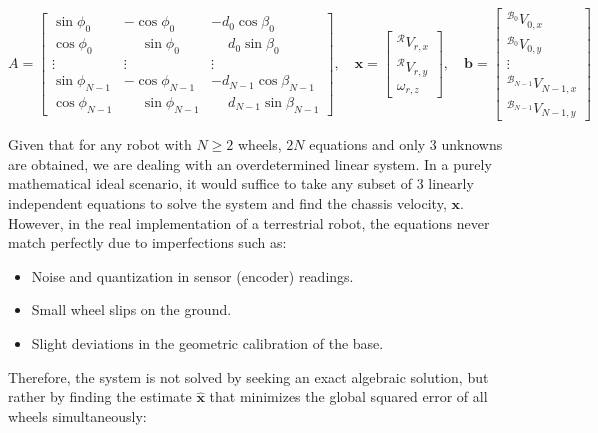 \documentclass[11pt,a4paper]{article}
\newcommand{\frameR}{\mathcal{R}}
\newcommand{\frameBZero}{\mathcal{B}_0}
\newcommand{\frameBNMinusOne}{\mathcal{B}_{N-1}}
\begin{document}
\[
    A = \begin{bmatrix}
        \sin\phi_0     & -\cos\phi_0               & -d_0\cos\beta_0                   \\
        \cos\phi_0     & \phantom{-}\sin\phi_0     & \phantom{-}d_0\sin\beta_0         \\
        \vdots         & \vdots                    & \vdots                            \\
        \sin\phi_{N-1} & -\cos\phi_{N-1}           & -d_{N-1}\cos\beta_{N-1}           \\
        \cos\phi_{N-1} & \phantom{-}\sin\phi_{N-1} & \phantom{-}d_{N-1}\sin\beta_{N-1}
    \end{bmatrix}, \quad \mathbf{x} =
    \begin{bmatrix}
        {}^\frameR V_{r,x} \\
        {}^\frameR V_{r,y} \\
        \omega_{r,z}
    \end{bmatrix}, \quad \mathbf{b} = \begin{bmatrix}
        {}^{\frameBZero}V_{0,x}        \\
        {}^{\frameBZero}V_{0,y}        \\
        \vdots                         \\
        {}^{\frameBNMinusOne}V_{N-1,x} \\
        {}^{\frameBNMinusOne}V_{N-1,y}
    \end{bmatrix}
\]

Given that for any robot with \(N \ge 2\) wheels, \(2N\) equations and only 3 unknowns are obtained, we are dealing with an overdetermined linear system. In a purely mathematical ideal scenario, it would suffice to take any subset of 3 linearly independent equations to solve the system and find the chassis velocity, \(\mathbf{x}\). However, in the real implementation of a terrestrial robot, the equations never match perfectly due to imperfections such as:

\begin{itemize}
    \item Noise and quantization in sensor (encoder) readings.
    \item Small wheel slips on the ground.
    \item Slight deviations in the geometric calibration of the base.
\end{itemize}

Therefore, the system is not solved by seeking an exact algebraic solution, but rather by finding the estimate \(\hat{\mathbf{x}}\) that minimizes the global squared error of all wheels simultaneously:
\end{document}
